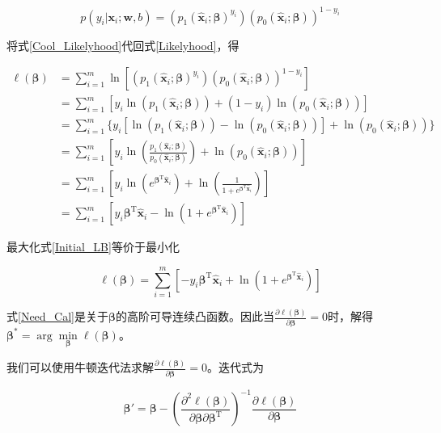 \documentclass{ctexart}
\begin{document}
	\begin{equation}
		p(y_i|\bm{x}_i;\bm{w},b)=(p_1(\hat{\bm{x}}_i;\bm{\beta})^{y_i})(p_0(\hat{\bm{x}}_i;\bm{\beta}))^{1-y_i}
		\label{Cool_Likelyhood}
	\end{equation}

	将式\eqref{Cool_Likelyhood}代回式\eqref{Likelyhood}，得
	
	\begin{equation}
		\begin{aligned}
			\ell(\bm{\beta})&=\sum_{i=1}^m\ln[(p_1(\hat{\bm{x}}_i;\bm{\beta})^{y_i})(p_0(\hat{\bm{x}}_i;\bm{\beta}))^{1-y_i}]\\
			&=\sum_{i=1}^m[y_i\ln(p_1(\hat{\bm{x}}_i;\bm{\beta}))+(1-y_i)\ln(p_0(\hat{\bm{x}}_i;\bm{\beta}))]\\
			&=\sum_{i=1}^m\{y_i[\ln(p_1(\hat{\bm{x}}_i;\bm{\beta}))-\ln(p_0(\hat{\bm{x}}_i;\bm{\beta}))]+\ln(p_0(\hat{\bm{x}}_i;\bm{\beta}))\} \\
			&=\sum_{i=1}^m\left[y_i\ln\left(\frac{p_1(\hat{\bm{x}}_i;\bm{\beta})}{p_0(\hat{\bm{x}}_i;\bm{\beta})}\right)+\ln(p_0(\hat{\bm{x}}_i;\bm{\beta}))\right]\\
			&=\sum_{i=1}^m\left[y_i\ln\left(e^{\bm{\beta}^\mathrm{T}\hat{\bm{x}}_i}\right)+\ln\left(\frac{1}{1+e^{\bm{\beta}^\mathrm{T}\hat{\bm{x}}_i}}\right)\right] \\
			&=\sum_{i=1}^m\left[y_i\bm{\beta}^\mathrm{T}\hat{\bm{x}}_i-\ln\left(1+e^{\bm{\beta}^\mathrm{T}\hat{\bm{x}}_i}\right)\right]
		\end{aligned}
		\label{Initial_LB}
	\end{equation}
	
	最大化式\eqref{Initial_LB}等价于最小化
	
	\begin{equation}
		\ell(\bm{\beta})=\sum_{i=1}^m\left[-y_i\bm{\beta}^\mathrm{T}\hat{\bm{x}}_i+\ln\left(1+e^{\bm{\beta}^\mathrm{T}\hat{\bm{x}}_i}\right)\right]
		\label{Need_Cal}
	\end{equation}
	
	式\eqref{Need_Cal}是关于$\bm{\beta}$的高阶可导连续凸函数。因此当$\frac{\partial\ell(\bm{\beta})}{\partial\bm{\beta}}=0$时，解得 $\bm{\beta}^\ast=\arg\min\limits_{\bm{\beta}}\ell(\bm{\beta})$。
	
	我们可以使用牛顿迭代法求解$\frac{\partial\ell(\bm{\beta})}{\partial\bm{\beta}}=0$。迭代式为
	
	\begin{equation}
		\bm{\beta}'=\bm{\beta}-\left(\frac{\partial^2\ell(\bm{\beta})}{\partial\bm{\beta}\partial\bm{\beta}^\mathrm{T}}\right)^{-1}\frac{\partial\ell(\bm{\beta})}{\partial\bm{\beta}}
		\label{Iter}
	\end{equation}
\end{document}
